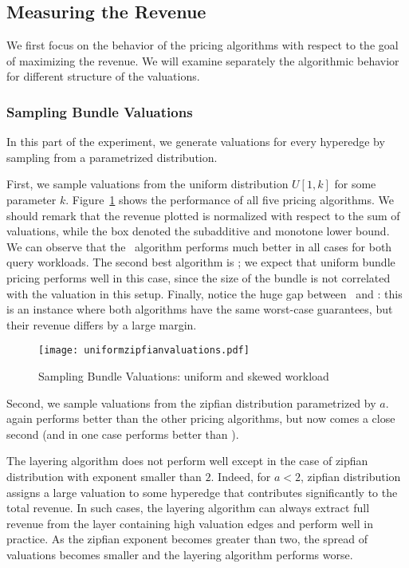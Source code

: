 \subsection{Measuring the Revenue }

We first focus on the behavior of the pricing algorithms with respect to the goal of 
maximizing the revenue. We will examine separately the algorithmic behavior for
different structure of the valuations.


\subsubsection{Sampling Bundle Valuations} 
In this part of the experiment, we generate valuations for every hyperedge by sampling 
from a parametrized distribution.

First, we sample valuations from the uniform distribution $U[1,k]$ for some parameter $k$.
Figure~\ref{fig:unifzipfian} shows the performance of all five pricing algorithms. We should
remark that the revenue plotted is normalized with respect to the sum of valuations, while
the box denoted the subadditive and monotone lower bound. 
We can observe that the \lpip\ algorithm performs much better in all cases for both query
workloads. The second best algorithm is \ubp; we expect that uniform bundle pricing performs
well in this case, since the size of the bundle is not correlated with the valuation in this setup.
Finally, notice the huge gap between \uip\ and \lpip: this is an instance where both algorithms have
the same worst-case guarantees, but their revenue differs by a large margin. 


\begin{figure}[!t]
	\centering
	\texttt{[image: uniformzipfianvaluations.pdf]}
	\caption{Sampling Bundle Valuations: uniform and skewed workload} \label{fig:unifzipfian}
\end{figure}  

Second, we sample valuations from the zipfian distribution parametrized by $a$.
\lpip again performs better than the other pricing algorithms, but now \ubp comes a close second
(and in one case performs better than \lpip).  

The layering algorithm does not perform well except in the case of zipfian distribution with exponent smaller than $2$. Indeed, for $a < 2$, zipfian distribution assigns a large valuation to some hyperedge that contributes significantly to the total revenue. In such cases, the layering algorithm can always extract full revenue from the layer containing high valuation edges and perform well in practice. As the zipfian exponent becomes greater than two, the spread of valuations becomes smaller and the layering algorithm performs worse. 

